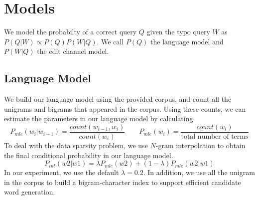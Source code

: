 
\usepackage{graphicx,amssymb,amsmath,enumerate}
\usepackage{courier}
\usepackage{color}
\usepackage{listings}
\usepackage{fancyvrb}
\usepackage{stmaryrd}

\oddsidemargin 0in
\evensidemargin 0in
\textwidth 6.5in
\topmargin -0.5in
\textheight 9.0in




\pagestyle{myheadings}  %

\section{Models}

We model the probabilty of a correct query $Q$ given the typo query $W$ as 
$P(Q | W) \propto P(Q) P(W | Q)$. 
We call $P(Q)$ the language model and $P(W | Q)$ the edit channel model.  


\subsection{Language Model}
We build our language model using the provided corpus, and count all the unigrams and bigrams that appeared in the corpus.
Using these counts, we can estimate the parameters in our language model by calculating
\begin{equation}\label{eq:1}
P_{mle}(w_i | w_{i-1}) = \frac{count(w_{i-1}, w_i)}{count(w_i)}
\qquad
P_{mle}(w_i) = \frac{count(w_i)}{\textrm{total number of terms}}
\end{equation}
To deal with the data sparsity problem, we use $N$-gram interpolation to obtain the final conditional probability in our language model.
\begin{equation}\label{eq:2}
P_{int}(w2 | w1) = \lambda P_{mle}(w2) + (1 - \lambda)P_{mle}(w2|w1)
\end{equation}
In our experiment, we use the default $\lambda = 0.2$.
In addition, we use all the unigram in the corpus to build a bigram-character index to support efficient candidate word generation.


